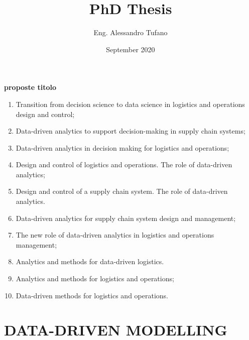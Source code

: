 \documentclass{book}
\title{PhD Thesis}
\author{Eng. Alessandro Tufano}
\date{September 2020}
\begin{document}
\textbf{proposte titolo}
\begin{enumerate}
    \item Transition from decision science to data science in logistics and operations design and control;
    \item Data-driven analytics to support decision-making in supply chain systems;
    \item Data-driven analytics in decision making for logistics and operations;
    \item Design and control of logistics and operations. The role of data-driven analytics;
    \item Design and control of a supply chain system. The role of data-driven analytics.
    \item Data-driven analytics for supply chain system design and management;
    \item The new role of data-driven analytics in logistics and operations management;
    \item Analytics and methods for data-driven logistics.
    \item Analytics and methods for logistics and operations;
    \item Data-driven methods for logistics and operations.
\end{enumerate}





\frontmatter


\maketitle

%
%
%
%



\tableofcontents






\mainmatter

\part{DATA-DRIVEN MODELLING}




\end{document}
